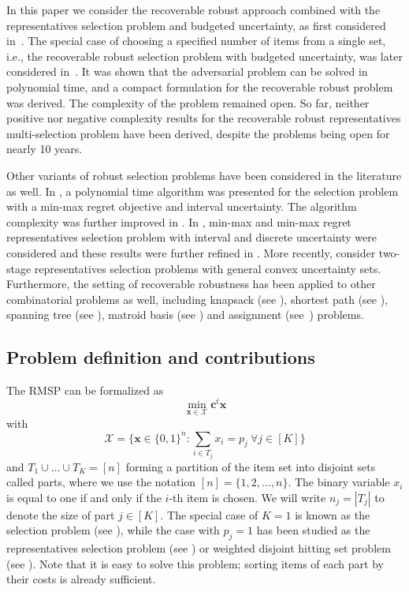 \documentclass[a4paper,11pt,abstracton]{scrartcl}
\theoremstyle{definition}
\theoremstyle{remark}
\newcommand{\X}{\mathcal{X}}
\begin{document}
In this paper we consider the
recoverable robust approach combined with the representatives selection problem and budgeted uncertainty, as first considered in~\cite{busing2011phd}. The special case of choosing a specified number of items from a single set, i.e., the recoverable robust selection problem with budgeted uncertainty, was later considered in~\cite{chassein2018recoverable}. It was shown that the adversarial problem can be solved in polynomial time, and a compact formulation for the recoverable robust problem was derived. The complexity of the problem remained open. So far, neither positive nor negative complexity results for the recoverable robust representatives multi-selection problem have been derived, despite the problems being open for nearly 10 years.

Other variants of robust selection problems have been considered in the literature as well. In \cite{averbakh2001complexity}, a polynomial time algorithm was presented for the selection problem with a min-max regret objective and interval uncertainty. The algorithm complexity was further improved in \cite{conde2004improved}. In \cite{dolgui2012min}, min-max and min-max regret representatives selection problem with interval and discrete uncertainty were considered and these results were further refined in \cite{deineko2013complexity}. More recently, \cite{goerigk2019robust} consider two-stage representatives selection problems with general convex uncertainty sets. 
Furthermore, the setting of recoverable robustness has been applied to other combinatorial problems as well, including knapsack (see \cite{busing2011recoverable}), shortest path (see \cite{busing2012paths}), spanning tree (see \cite{hradovich2017recoverable-MST}), matroid basis (see \cite{hradovich2017recoverable,lendl2019matroid,iwamasa2021optimal}) and assignment (see~\cite{fischer2020investigation}) problems.


\subsection{Problem definition and contributions}


The RMSP can be formalized as
\[ \min_{\pmb{x}\in\X} \pmb{c}^t \pmb{x} \]
with 
\[ \X = \{ \pmb{x}\in\{0,1\}^n : \sum_{i\in T_j} x_i = p_j\ \forall j\in[K]\} \]
and $T_1 \cup \ldots \cup T_K = [n]$ forming a partition of the item set into disjoint sets called parts, where we use the notation $[n]=\{1,2,\ldots,n\}$. The binary variable $x_i$ is equal to one if and only if the $i$-th item is chosen. We will write $n_j = |T_j|$ to denote the size of part $j\in[K]$. The special case of $K=1$ is known as the selection problem (see \cite{kasperski2015robust}), while the case with $p_j=1$ has been studied as the representatives selection problem (see \cite{kasperski2015approximability}) or weighted disjoint hitting set problem (see \cite{busing2011phd}). Note that it is easy to solve this problem; sorting items of each part by their costs is already sufficient.
\end{document}
